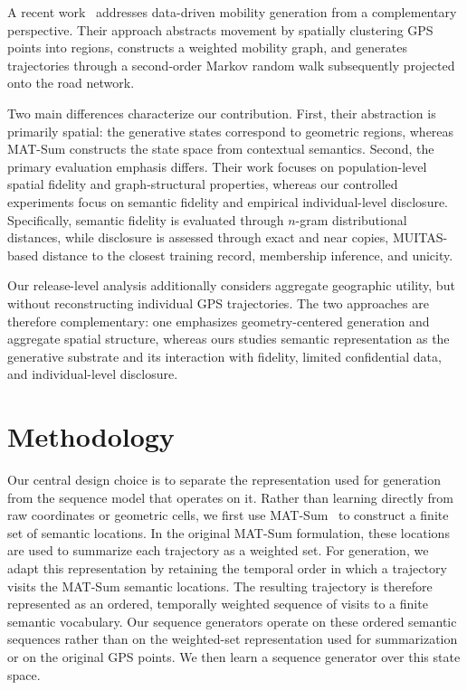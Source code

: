 \documentclass[sigconf,nonacm]{acmart}
\begin{document}
A recent work~\cite{kavalionak2026} addresses data-driven mobility generation from a complementary perspective. Their approach abstracts movement by spatially clustering GPS points into regions, constructs a weighted mobility graph, and generates trajectories through a second-order Markov random walk subsequently projected onto the road network.

Two main differences characterize our contribution. First, their
abstraction is primarily spatial: the generative states correspond to geometric regions, whereas MAT-Sum constructs the state space from contextual semantics. Second, the primary evaluation emphasis differs.
Their work focuses on population-level spatial fidelity and
graph-structural properties, whereas our controlled experiments focus on semantic fidelity and empirical individual-level disclosure.
Specifically, semantic fidelity is evaluated through $n$-gram
distributional distances, while disclosure is assessed through exact and near copies, MUITAS-based distance to the closest training record, membership inference, and unicity.

Our release-level analysis additionally considers aggregate geographic
utility, but without reconstructing individual GPS trajectories.
The two approaches are therefore complementary: one emphasizes
geometry-centered generation and aggregate spatial structure, whereas
ours studies semantic representation as the generative substrate and
its interaction with fidelity, limited confidential data, and
individual-level disclosure.

\section{Methodology}
\label{sec:method}


Our central design choice is to separate the representation used
for generation from the sequence model that operates on it.
Rather than learning directly from raw coordinates or geometric cells,
we first use MAT-Sum~\cite{pugliese2023} to construct a finite set of semantic locations. In the original MAT-Sum formulation, these locations are used to summarize each trajectory as a weighted set.
For generation, we adapt this representation by retaining the temporal order in which a trajectory visits the MAT-Sum semantic locations.
The resulting trajectory is therefore represented as an ordered,
temporally weighted sequence of visits to a finite semantic vocabulary. Our sequence generators operate on these ordered semantic sequences rather than on the weighted-set representation used for summarization or on the original GPS points. We then learn a sequence generator over this state space.
\end{document}
